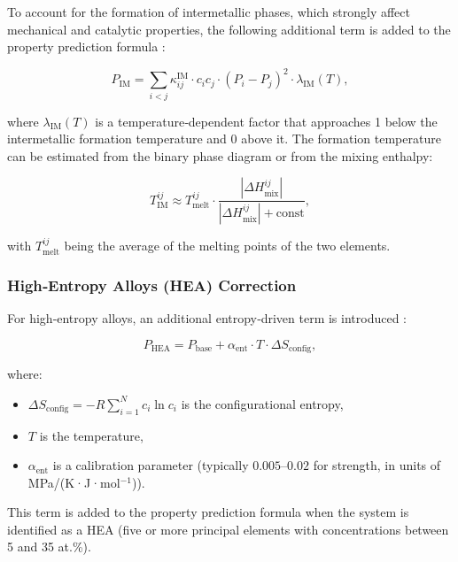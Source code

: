 \documentclass[12pt,a4paper]{article}
\begin{document}
	To account for the formation of intermetallic phases, which strongly affect mechanical and catalytic properties, the following additional term is added to the property prediction formula \cite{Wen2019}:
	
	\begin{equation}
		P_{\text{IM}} = \sum_{i<j} \kappa_{ij}^{\text{IM}} \cdot c_i c_j \cdot (P_i - P_j)^2 \cdot \lambda_{\text{IM}}(T),
		\label{eq:intermetallic}
	\end{equation}
	
	where \(\lambda_{\text{IM}}(T)\) is a temperature‑dependent factor that approaches 1 below the intermetallic formation temperature and 0 above it. The formation temperature can be estimated from the binary phase diagram or from the mixing enthalpy:
	
	\begin{equation}
		T_{\text{IM}}^{ij} \approx T_{\text{melt}}^{ij} \cdot \frac{|\Delta H_{\text{mix}}^{ij}|}{|\Delta H_{\text{mix}}^{ij}| + \text{const}},
		\label{eq:tim}
	\end{equation}
	
	with \(T_{\text{melt}}^{ij}\) being the average of the melting points of the two elements.
	
	\subsubsection{High‑Entropy Alloys (HEA) Correction}
	
	For high‑entropy alloys, an additional entropy‑driven term is introduced \cite{Wen2019, Yang2012}:
	
	\begin{equation}
		P_{\text{HEA}} = P_{\text{base}} + \alpha_{\text{ent}} \cdot T \cdot \Delta S_{\text{config}},
		\label{eq:hea}
	\end{equation}
	
	where:
	\begin{itemize}
		\item \(\Delta S_{\text{config}} = -R \sum_{i=1}^{N} c_i \ln c_i\) is the configurational entropy,
		\item \(T\) is the temperature,
		\item \(\alpha_{\text{ent}}\) is a calibration parameter (typically \(0.005\)–\(0.02\) for strength, in units of MPa/(K·J·mol\(^{-1}\))).
	\end{itemize}
	
	This term is added to the property prediction formula when the system is identified as a HEA (five or more principal elements with concentrations between 5 and 35 at.\%).
	
\end{document}
